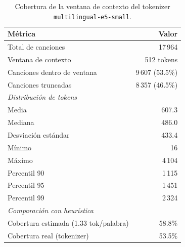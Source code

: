 \begin{table}[htbp]
\centering
\caption{Cobertura de la ventana de contexto del tokenizer \texttt{multilingual-e5-small}.}
\label{tab:token_coverage}
\begin{tabular}{lr}
\toprule
Métrica & Valor \\
\midrule
Total de canciones & 17\,964 \\
Ventana de contexto & 512 tokens \\
Canciones dentro de ventana & 9\,607 (53.5\%) \\
Canciones truncadas & 8\,357 (46.5\%) \\
\midrule
\multicolumn{2}{l}{\textit{Distribución de tokens}} \\
\midrule
Media & 607.3 \\
Mediana & 486.0 \\
Desviación estándar & 433.4 \\
Mínimo & 16 \\
Máximo & 4\,104 \\
Percentil 90 & 1\,115 \\
Percentil 95 & 1\,451 \\
Percentil 99 & 2\,324 \\
\midrule
\multicolumn{2}{l}{\textit{Comparación con heurística}} \\
\midrule
Cobertura estimada (1.33 tok/palabra) & 58.8\% \\
Cobertura real (tokenizer) & 53.5\% \\
\bottomrule
\end{tabular}
\end{table}